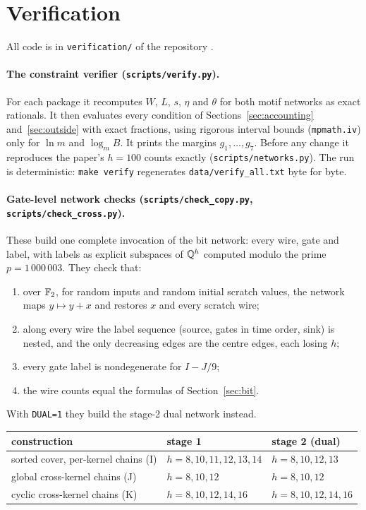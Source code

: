 \section{Verification}\label{sec:verification}

All code is in \texttt{verification/} of the repository \cite{repo}.

\paragraph{The constraint verifier (\texttt{scripts/verify.py}).} For each package it recomputes $W$, $L$, $s$, $\eta$ and $\theta$ for both motif networks as exact rationals. It then evaluates every condition of Sections~\ref{sec:accounting} and~\ref{sec:outside} with exact fractions, using rigorous interval bounds (\texttt{mpmath.iv}) only for $\ln m$ and $\log_m B$. It prints the margins $g_1,\dots,g_7$. Before any change it reproduces the paper's $h = 100$ counts exactly (\texttt{scripts/networks.py}). The run is deterministic: \texttt{make verify} regenerates \texttt{data/verify\_all.txt} byte for byte.

\paragraph{Gate-level network checks (\texttt{scripts/check\_copy.py}, \texttt{scripts/check\_cross.py}).} These build one complete invocation of the bit network: every wire, gate and label, with labels as explicit subspaces of $\mathbb{Q}^h$ computed modulo the prime $p = 1\,000\,003$. They check that:
\begin{enumerate}[leftmargin=*]
\item over $\mathbb{F}_2$, for random inputs and random initial scratch values, the network maps $y\mapsto y+x$ and restores $x$ and every scratch wire;
\item along every wire the label sequence (source, gates in time order, sink) is nested, and the only decreasing edges are the centre edges, each losing $h$;
\item every gate label is nondegenerate for $I - J/9$;
\item the wire counts equal the formulas of Section~\ref{sec:bit}.
\end{enumerate}
With \texttt{DUAL=1} they build the stage-2 dual network instead.

\begin{center}
\small
\begin{tabular}{@{}lll@{}}
\toprule
construction & stage 1 & stage 2 (dual) \\
\midrule
sorted cover, per-kernel chains (I) & $h = 8, 10, 11, 12, 13, 14$ & $h = 8, 10, 12, 13$ \\
global cross-kernel chains (J) & $h = 8, 10, 12$ & $h = 8, 10, 12$ \\
cyclic cross-kernel chains (K) & $h = 8, 10, 12, 14, 16$ & $h = 8, 10, 12, 14, 16$ \\
\bottomrule
\end{tabular}
\end{center}

